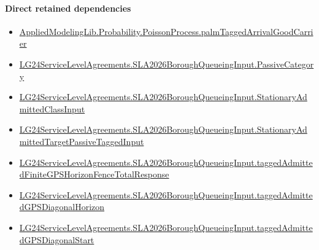 \documentclass[10pt]{article}
\begin{document}
\paragraph{Direct retained dependencies}
\begin{itemize}\raggedright
\item \hyperlink{governing-declaration-ae13476c571ece6d}{Applied\allowbreak{}Modeling\allowbreak{}Lib.\allowbreak{}Probability.\allowbreak{}Poisson\allowbreak{}Process.\allowbreak{}palm\allowbreak{}Tagged\allowbreak{}Arrival\allowbreak{}Good\allowbreak{}Carrier}
\item \hyperlink{governing-declaration-abc91e26948cf0a3}{LG24\allowbreak{}Service\allowbreak{}Level\allowbreak{}Agreements.\allowbreak{}SLA2026\allowbreak{}Borough\allowbreak{}Queueing\allowbreak{}Input.\allowbreak{}Passive\allowbreak{}Category}
\item \hyperlink{governing-declaration-f3072ff54a3653c2}{LG24\allowbreak{}Service\allowbreak{}Level\allowbreak{}Agreements.\allowbreak{}SLA2026\allowbreak{}Borough\allowbreak{}Queueing\allowbreak{}Input.\allowbreak{}Stationary\allowbreak{}Admitted\allowbreak{}Class\allowbreak{}Input}
\item \hyperlink{governing-declaration-8796a25a610eaea9}{LG24\allowbreak{}Service\allowbreak{}Level\allowbreak{}Agreements.\allowbreak{}SLA2026\allowbreak{}Borough\allowbreak{}Queueing\allowbreak{}Input.\allowbreak{}Stationary\allowbreak{}Admitted\allowbreak{}Target\allowbreak{}Passive\allowbreak{}Tagged\allowbreak{}Input}
\item \hyperlink{governing-declaration-428770db1fa0a080}{LG24\allowbreak{}Service\allowbreak{}Level\allowbreak{}Agreements.\allowbreak{}SLA2026\allowbreak{}Borough\allowbreak{}Queueing\allowbreak{}Input.\allowbreak{}tagged\allowbreak{}Admitted\allowbreak{}Finite\allowbreak{}GPS\allowbreak{}Horizon\allowbreak{}Fence\allowbreak{}Total\allowbreak{}Response}
\item \hyperlink{governing-declaration-ee7b3b51b40fbef7}{LG24\allowbreak{}Service\allowbreak{}Level\allowbreak{}Agreements.\allowbreak{}SLA2026\allowbreak{}Borough\allowbreak{}Queueing\allowbreak{}Input.\allowbreak{}tagged\allowbreak{}Admitted\allowbreak{}GPS\allowbreak{}Diagonal\allowbreak{}Horizon}
\item \hyperlink{governing-declaration-2db3bc290bc3b96f}{LG24\allowbreak{}Service\allowbreak{}Level\allowbreak{}Agreements.\allowbreak{}SLA2026\allowbreak{}Borough\allowbreak{}Queueing\allowbreak{}Input.\allowbreak{}tagged\allowbreak{}Admitted\allowbreak{}GPS\allowbreak{}Diagonal\allowbreak{}Start}
\end{itemize}
\hypertarget{governing-declaration-4f104ceacdba01dd}{}
\end{document}
